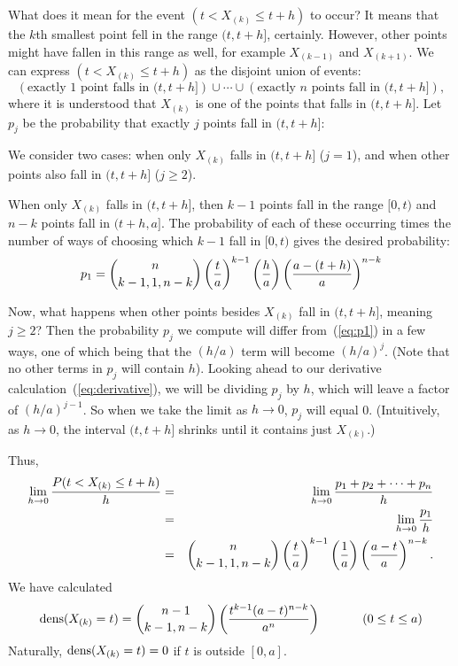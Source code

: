What does it mean for the event $(t< X_{(k)}\leq t+h)$ to occur?
It means that the $k$th smallest point fell in the range $(t,t+h]$,
certainly.  
However, other points might have fallen in this range as well,  
for example $X_{(k-1)}$ and $X_{(k+1)}$.
We can express $(t< X_{(k)}\leq t+h)$ as the disjoint union of events:
\[
  (\mbox{exactly 1 point falls in $(t,t+h]$}) \cup 
  \cdots \cup
  (\mbox{exactly $n$ points fall in $(t,t+h]$}),
\]
where it is understood that $X_{(k)}$ is one of the points that falls in
$(t,t+h]$.
Let $p_j$ be the probability that exactly $j$ points fall in $(t,t+h]$: 
\begin{center}
\mbox{}
\end{center}
We consider two cases:  
when only $X_{(k)}$ falls in $(t,t+h]$ ($j=1$), and when other
points also fall in $(t,t+h]$ ($j\geq 2$). 

When only $X_{(k)}$ falls in $(t,t+h]$, then $k-1$ points
fall in the range $[0,t)$ and $n-k$ points fall in $(t+h,a]$.
The probability of each of these occurring times the number of
ways of choosing which $k-1$ fall in $[0,t)$ gives the
desired probability: 
\begin{equation}
  p_1 = 
	{n\choose k-1,1,n-k}\left(\frac{t}{a}\right)^{k-1}
			\left(\frac{h}{a}\right)
			\left(\frac{a-(t+h)}{a}\right)^{n-k}
\label{eq:p1}
\end{equation}

Now, what happens when other points besides $X_{(k)}$ fall in
$(t,t+h]$, meaning $j\geq 2$?
Then the probability $p_j$ we compute will differ from~(\ref{eq:p1}) 
in a few ways, one of which being that the $(h/a)$ term will become 
$(h/a)^j$.
(Note that no other terms in $p_j$ will contain $h$).  
Looking ahead to our derivative calculation~(\ref{eq:derivative}),
we will be dividing $p_j$
by $h$, which will leave a factor of $(h/a)^{j-1}$.
So when we take the limit as $h\rightarrow 0$, $p_j$ will equal 0. 
(Intuitively, as $h\rightarrow 0$, the interval $(t,t+h]$
shrinks until it contains just $X_{(k)}$.) 

Thus, 
\begin{eqnarray*}
\lim_{h\rightarrow 0} \frac{P(t< X_{(k)}\leq t+h)}{h}  
& = &
\lim_{h\rightarrow 0} \frac{p_1 + p_2 + \cdots + p_n}{h}  \\
& = &
\lim_{h\rightarrow 0} \frac{p_1}{h}  \\
& = &
{n\choose k-1,1,n-k}\left(\frac{t}{a}\right)^{k-1}
		\left(\frac{1}{a}\right)
		\left(\frac{a-t}{a}\right)^{n-k}.
\end{eqnarray*}
We have calculated
\begin{equation}
  \mbox{dens}(X_{(k)} = t) = 
     {n-1\choose k-1,n-k}
	\left(\frac{t^{k-1}(a-t)^{n-k}}
		{a^n}
	      \right)~~~~~~~~~~(0\leq t\leq a)
\label{eq:uniform_dens}
\end{equation}
Naturally, $\mbox{dens}(X_{(k)} = t) = 0$ if $t$ is outside $[0,a]$.
\QED  

